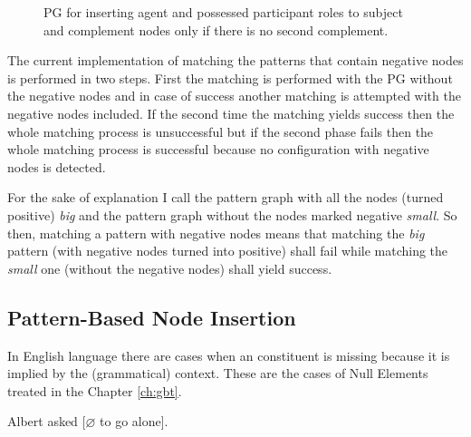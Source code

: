 \begin{figure}[hbtp]
\centering
{}
\caption{PG for inserting agent and possessed participant roles to subject and complement nodes only if there is no second complement.}
\label{fig:gp4}
\end{figure}

The current implementation of matching the patterns that contain negative nodes is performed in two steps. First the matching is performed with the PG without the negative nodes and in case of success another matching is attempted with the negative nodes included. If the second time the matching yields success then the whole matching process is unsuccessful but if the second phase fails then the whole matching process is successful because no configuration with negative nodes is detected.

For the sake of explanation I call the pattern graph with all the nodes (turned positive) \textit{big} and the pattern graph without the nodes marked negative \textit{small}. So then, matching a pattern with negative nodes means that matching the \textit{big} pattern (with negative nodes turned into positive) shall fail while matching the \textit{small} one (without the negative nodes) shall yield success.

%
\subsection{Pattern-Based Node Insertion} 
In English language there are cases when an constituent is missing because it is implied by the (grammatical) context. These are the cases of Null Elements treated in the Chapter \ref{ch:gbt}. 

\begin{exe}
	\ex\label{ex:albert} Albert asked [$\varnothing$ to go alone].
\end{exe}

